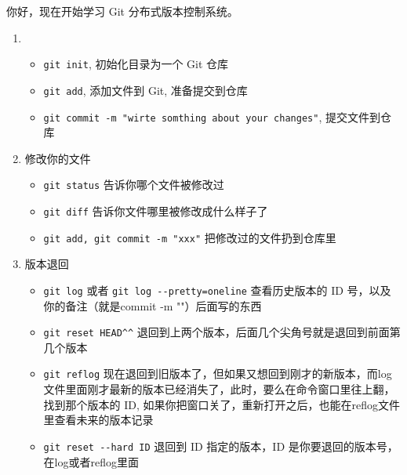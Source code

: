 \documentclass[UTF8]{ctexart}
\begin{document}
你好，现在开始学习 Git 分布式版本控制系统。\par
\begin{enumerate}
  \item
  \begin{itemize}
    \item \verb|git init|, 初始化目录为一个 Git 仓库
    \item \verb|git add|, 添加文件到 Git, 准备提交到仓库
    \item \verb|git commit -m "wirte somthing about your changes"|, 提交文件到仓库
  \end{itemize}
  \item 修改你的文件
  \begin{itemize}
    \item \verb|git status| 告诉你哪个文件被修改过
    \item \verb|git diff| 告诉你文件哪里被修改成什么样子了
    \item \verb|git add, git commit -m "xxx"| 把修改过的文件扔到仓库里
  \end{itemize}
  \item 版本退回
  \begin{itemize}
    \item \verb|git log| 或者 \verb|git log --pretty=oneline| 查看历史版本的 ID 号，以及你的备注（就是commit -m ""）后面写的东西
    \item \verb|git reset HEAD^^| 退回到上两个版本，后面几个尖角号就是退回到前面第几个版本
    \item \verb|git reflog| 现在退回到旧版本了，但如果又想回到刚才的新版本，而log文件里面刚才最新的版本已经消失了，此时，要么在命令窗口里往上翻，找到那个版本的 ID, 如果你把窗口关了，重新打开之后，也能在reflog文件里查看未来的版本记录
    \item \verb|git reset --hard ID| 退回到 ID 指定的版本，ID 是你要退回的版本号，在log或者reflog里面
  \end{itemize}
\end{enumerate}
\end{document}
